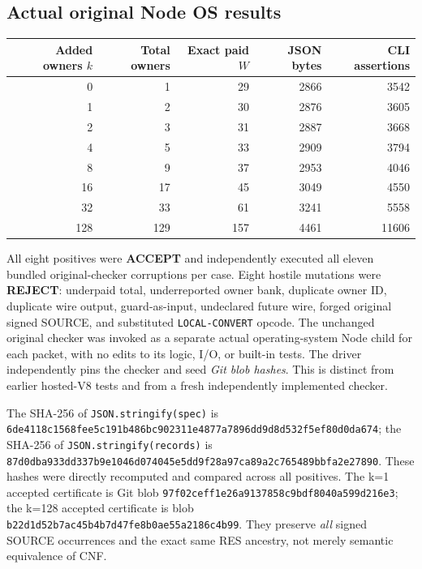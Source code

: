 \documentclass[11pt]{article}
\begin{document}
\subsection*{Actual original Node OS results}
\begin{center}
\begin{tabular}{rrrrr}
\toprule
Added owners \(k\)&Total owners&Exact paid \(W\)&JSON bytes&CLI assertions\\
\midrule
0&1&29&2866&3542\\
1&2&30&2876&3605\\
2&3&31&2887&3668\\
4&5&33&2909&3794\\
8&9&37&2953&4046\\
16&17&45&3049&4550\\
32&33&61&3241&5558\\
128&129&157&4461&11606\\
\bottomrule
\end{tabular}
\end{center}
All eight positives were \textbf{ACCEPT} and independently executed all eleven bundled original-checker corruptions per case. Eight hostile mutations were \textbf{REJECT}: underpaid total, underreported owner bank, duplicate owner ID, duplicate wire output, guard-as-input, undeclared future wire, forged original signed SOURCE, and substituted \texttt{LOCAL-CONVERT} opcode. The unchanged original checker was invoked as a separate actual operating-system Node child for each packet, with no edits to its logic, I/O, or built-in tests. The driver independently pins the checker and seed \emph{Git blob hashes}. This is distinct from earlier hosted-V8 tests and from a fresh independently implemented checker.

The SHA-256 of \texttt{JSON.stringify(spec)} is
\texttt{6de4118c1568fee5c191b486bc902311e4877a7896dd9d8d532f5ef80d0da674};
the SHA-256 of \texttt{JSON.stringify(records)} is
\texttt{87d0dba933dd337b9e1046d074045e5dd9f28a97ca89a2c765489bbfa2e27890}.
These hashes were directly recomputed and compared across all positives.
The k=1 accepted certificate is Git blob \texttt{97f02ceff1e26a9137858c9bdf8040a599d216e3}; the k=128 accepted certificate is blob \texttt{b22d1d52b7ac45b4b7d47fe8b0ae55a2186c4b99}. They preserve \emph{all} signed SOURCE occurrences and the exact same RES ancestry, not merely semantic equivalence of CNF.
\end{document}
